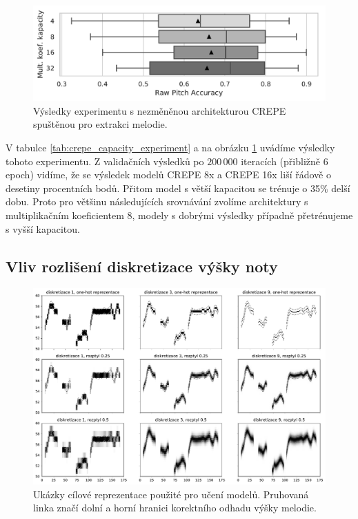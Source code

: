 \begin{figure}[h]\centering
    \includegraphics[scale=0.6]{../img/figures/crepe_kapacita_grey}
\caption{Výsledky experimentu s nezměněnou architekturou CREPE spuštěnou pro extrakci melodie.}
\label{obr:crepe_capacity_experiment}
\end{figure}

V tabulce \ref{tab:crepe_capacity_experiment} a na obrázku \ref{obr:crepe_capacity_experiment} uvádíme výsledky tohoto experimentu. Z validačních výsledků po $200\,000$ iteracích (přibližně 6 epoch) vidíme, že se výsledek modelů CREPE 8x a CREPE 16x liší řádově o desetiny procentních bodů. Přitom model s větší kapacitou se trénuje o 35\% delší dobu. Proto pro většinu následujících srovnávání zvolíme architektury s multiplikačním koeficientem 8, modely s dobrými výsledky případně přetrénujeme s vyšší kapacitou.

\subsection{Vliv rozlišení diskretizace výšky noty}\label{sec:crepe_diskretizace}

\begin{figure}[h]\centering
    \includegraphics[width=\textwidth,height=\textheight,keepaspectratio]{../img/reprezentace_vstupu_grey}
\caption{Ukázky cílové reprezentace použité pro učení modelů. Pruhovaná linka značí dolní a horní hranici korektního odhadu výšky melodie.}\label{obr:reprezentace_vstupu}
\end{figure}

